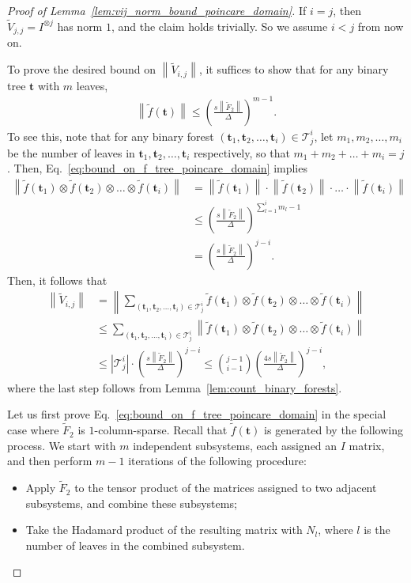 \documentclass[superscriptaddress,onecolumn,nofootinbib,longbibliography,a4paper,accepted=2026-09-29]{quantumarticle}
\theoremstyle{plain}
\theoremstyle{definition}
\numberwithin{thm}{section}
\numberwithin{assumption}{section}
\numberwithin{lemma}{section}
\numberwithin{prop}{section}
\numberwithin{cor}{section}
\numberwithin{definition}{section}
\numberwithin{rmk}{section}
\numberwithin{equation}{section}
\newcommand{\norm}[1]     {\left\| #1 \right\|}
\newcommand{\lrb}[1]{\left ( #1 \right )}
\newcommand{\mbt}{\mathbf{t}}
\begin{document}
\begin{proof}[Proof of Lemma~\ref{lem:vij_norm_bound_poincare_domain}]
If $i=j$, then $\tilde{V}_{j,j}=I^{\otimes j}$ has norm $1$, and the claim holds trivially. So we assume $i<j$ from now on.

To prove the desired bound on $\norm{\tilde{V}_{i,j}}$, it suffices to show that for any binary tree $\mbt$ with $m$ leaves, 
\begin{align}
 \norm{\tilde{f}(\mbt)} \le \lrb{\frac{s\norm{\tilde{F}_2}}{\Delta}}^{m-1}.   
 \label{eq:bound_on_f_tree_poincare_domain}
\end{align}
To see this, note that for any binary forest $(\mbt_1, \mbt_2, \dots, \mbt_i) \in \mathcal{T}^i_j$, let $m_1,m_2,\dots,m_i$ be the number of leaves in $\mbt_1, \mbt_2,\dots, \mbt_i$ respectively, so that $m_1+m_2+\dots+m_i=j$. Then,
Eq.~\eqref{eq:bound_on_f_tree_poincare_domain} implies
\begin{align}
\norm{\tilde{f}(\mbt_1)\otimes \tilde{f}(\mbt_2)\otimes \dots \otimes \tilde{f}(\mbt_i)}
&= \norm{\tilde{f}(\mbt_1)}\cdot
        \norm{\tilde{f}(\mbt_2)} \cdot
        \dots
         \cdot   \norm{\tilde{f}(\mbt_i)}  \\
&\le 
 \lrb{\frac{s\norm{\tilde{F}_2}}{\Delta}}^{\sum_{l=1}^i m_l -1} \\
 &= 
 \lrb{\frac{s\norm{\tilde{F}_2}}{\Delta}}^{j-i}.
\end{align}
Then, it follows that
\begin{align}
\norm{\tilde{V}_{i,j}} &= \left\|\sum_{(\mbt_1, \mbt_2, \dots, \mbt_i) \in \mathcal{T}^i_j}
    \tilde{f}(\mbt_1)\otimes \tilde{f}(\mbt_2)\otimes \dots \otimes \tilde{f}(\mbt_i)\right\| \\ 
    &\le \sum_{(\mbt_1, \mbt_2, \dots, \mbt_i) \in \mathcal{T}^i_j}
    \norm{\tilde{f}(\mbt_1)\otimes \tilde{f}(\mbt_2)\otimes \dots \otimes \tilde{f}(\mbt_i)} \\ 
    &\le |\mathcal{T}^i_j| \cdot \lrb{\frac{s\norm{\tilde{F}_2}}{\Delta}}^{j-i} \le \binom{j-1}{i-1}\lrb{\frac{4s\norm{\tilde{F}_2}}{\Delta}}^{j-i},
\end{align}
where the last step follows from Lemma~\ref{lem:count_binary_forests}.

Let us first prove Eq.~\eqref{eq:bound_on_f_tree_poincare_domain} in the special case where $\tilde{F}_2$ is $1$-column-sparse. Recall that \( \tilde{f}(\mbt) \) is generated by the following process. We start with \( m \) independent subsystems, each assigned an \( I \) matrix, and then perform \( m-1 \) iterations of the following procedure: 
\begin{itemize} 
\item Apply \( \tilde{F}_2 \) to the tensor product of the matrices assigned to two adjacent subsystems, and combine these subsystems; 
\item Take the Hadamard product of the resulting matrix with \( N_l \), where \( l \) is the number of leaves in the combined subsystem. 
\end{itemize} 


\end{proof}
\end{document}
